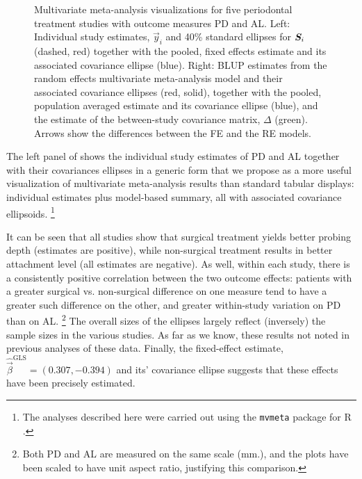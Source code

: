 \begin{figure}[htb]
\begin{minipage}[b]{.49\linewidth}
 \end{minipage}
  \caption{Multivariate meta-analysis visualizations for five periodontal treatment studies with outcome measures PD and AL.
  Left: Individual study estimates, $\vec{y}_i$ and 40\% standard ellipses for $\bm{S}_i$ (dashed, red) together with the pooled,
  fixed effects estimate and its associated covariance ellipse (blue).
  Right:  BLUP estimates from the random effects multivariate meta-analysis model and their associated covariance ellipses
  (red, solid), together with the pooled, population averaged estimate and its covariance ellipse (blue), and the estimate
  of the between-study covariance matrix, $\Delta$ (green). Arrows show the differences between the FE and the RE models.}
  \label{fig:mvmeta2}
\end{figure}

The left panel of  shows the individual study estimates of PD and AL together with their covariances ellipses
in a generic form that we propose as a more useful visualization of multivariate meta-analysis results than standard 
tabular displays: individual estimates plus model-based summary, all with associated covariance ellipsoids.%
\footnote{The analyses described here were carried out using the \texttt{mvmeta} package for R \citep{mvmeta}.}

It can be seen that all studies show that surgical treatment yields better probing depth (estimates are positive), while 
non-surgical treatment results in better attachment level (all estimates are negative).  As well, within each study, there is a consistently
positive correlation between the two outcome effects: patients with a greater surgical vs. non-surgical difference on one
measure tend to have a greater such difference on the other, and greater within-study variation on PD than on AL.%
\footnote{Both PD and AL are measured on the same scale (mm.), and the plots have been scaled to have unit aspect ratio,
justifying this comparison.} 
The overall sizes of the ellipses largely reflect (inversely) the sample sizes in the various studies.
As far as we know, these results not noted in previous analyses of these data.
Finally, the fixed-effect estimate, $\widehat{\vec{\beta}}^{\textrm{GLS}} = (0.307, -0.394)$
and its' covariance ellipse suggests that these effects have been precisely estimated.

